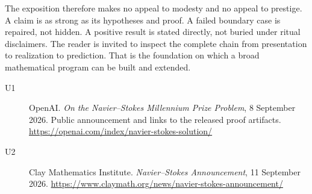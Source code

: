The exposition therefore makes no appeal to modesty and no appeal to prestige. A claim is as strong as its hypotheses and proof. A failed boundary case is repaired, not hidden. A positive result is stated directly, not buried under ritual disclaimers. The reader is invited to inspect the complete chain from presentation to realization to prediction. That is the foundation on which a broad mathematical program can be built and extended.

\begin{description}
\item[U1] OpenAI. \emph{On the Navier--Stokes Millennium Prize Problem}, 8 September 2026. Public announcement and links to the released proof artifacts. \url{https://openai.com/index/navier-stokes-solution/}
\item[U2] Clay Mathematics Institute. \emph{Navier--Stokes Announcement}, 11 September 2026. \url{https://www.claymath.org/news/navier-stokes-announcement/}
\end{description}
